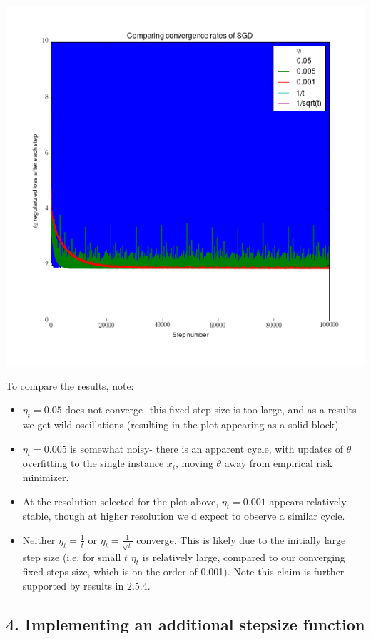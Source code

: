 \documentclass[paper=a4, fontsize=11pt]{scrartcl} %
\numberwithin{equation}{section} %
\numberwithin{figure}{section} %
\numberwithin{table}{section} %
\begin{document}
\includegraphics[scale=.8]{./../figures/2_6_3.png}

To compare the results, note:
\begin{itemize}
\item $\eta_t = 0.05$ does not converge- this fixed step size is too large, and as a results we get wild oscillations (resulting in the plot appearing as a solid block).
\item $\eta_t = 0.005$ is somewhat noisy- there is an apparent cycle, with updates of $\theta$ overfitting to the single instance $x_i$, moving $\theta$ away from empirical risk minimizer. 
\item At the resolution selected for the plot above, $\eta_t = 0.001$ appears relatively stable, though at higher resolution we'd expect to observe a similar cycle.
\item Neither $\eta_t = \frac{1}{t}$ or $\eta_t = \frac{1}{\sqrt{t}}$ converge. This is likely due to the initially large step size (i.e. for small $t$ $\eta_t$ is relatively large,  compared to our converging fixed steps size, which is on the order of 0.001). Note this claim is further supported by results in 2.5.4.
\end{itemize}

\subsection*{4. Implementing an additional stepsize function}
\end{document}
